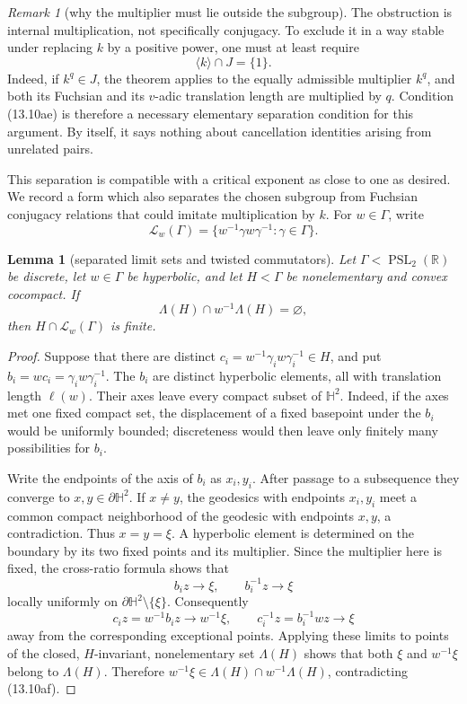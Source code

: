 \documentclass[11pt,reqno]{amsart}
\newtheorem{lemma}[theorem]{Lemma}
\theoremstyle{definition}
\theoremstyle{remark}
\newtheorem{remark}[theorem]{Remark}
\newcommand{\R}{\mathbb R}
\newcommand{\PSL}{\operatorname{PSL}}
\begin{document}
\begin{remark}[why the multiplier must lie outside the subgroup]
The obstruction is internal multiplication, not specifically conjugacy.
To exclude it in a way stable under replacing \(k\) by a positive power,
one must at least require
\[
 \langle k\rangle\cap J=\{1\}.
\tag{13.10ae}
\]
Indeed, if \(k^q\in J\), the theorem applies to the equally admissible
multiplier \(k^q\), and both its Fuchsian and its \(v\)-adic translation
length are multiplied by \(q\).  Condition (13.10ae) is therefore a
necessary elementary separation condition for this argument.  By itself,
it says nothing about cancellation identities arising from unrelated pairs.
\end{remark}

This separation is compatible with a critical exponent as close
to one as desired.  We record a form which also separates the chosen
subgroup from Fuchsian conjugacy relations that could imitate multiplication
by \(k\).  For \(w\in\Gamma\), write
\[
 \mathcal L_w(\Gamma)
 =\{w^{-1}\gamma w\gamma^{-1}:\gamma\in\Gamma\}.
\]

\begin{lemma}[separated limit sets and twisted commutators]
\label{lem:finite-twisted-commutators}
Let \(\Gamma<\PSL_2(\R)\) be discrete, let \(w\in\Gamma\) be hyperbolic,
and let \(H<\Gamma\) be nonelementary and convex cocompact.  If
\[
 \Lambda(H)\cap w^{-1}\Lambda(H)=\varnothing,
\tag{13.10af}
\]
then \(H\cap\mathcal L_w(\Gamma)\) is finite.
\end{lemma}

\begin{proof}
Suppose that there are distinct
\(c_i=w^{-1}\gamma_iw\gamma_i^{-1}\in H\), and put
\(b_i=wc_i=\gamma_iw\gamma_i^{-1}\).  The \(b_i\) are distinct
hyperbolic elements, all with translation length \(\ell(w)\).  Their axes
leave every compact subset of \(\mathbb H^2\).  Indeed, if the axes met one
fixed compact set, the displacement of a fixed basepoint under the \(b_i\)
would be uniformly bounded; discreteness would then leave only finitely
many possibilities for \(b_i\).

Write the endpoints of the axis of \(b_i\) as \(x_i,y_i\).  After passage
to a subsequence they converge to \(x,y\in\partial\mathbb H^2\).  If
\(x\ne y\), the geodesics with endpoints \(x_i,y_i\) meet a common compact
neighborhood of the geodesic with endpoints \(x,y\), a contradiction.
Thus \(x=y=\xi\).  A hyperbolic element is determined on the boundary by
its two fixed points and its multiplier.  Since the multiplier here is
fixed, the cross-ratio formula shows that
\[
 b_i z\longrightarrow\xi,
 \qquad b_i^{-1}z\longrightarrow\xi
\]
locally uniformly on
\(\partial\mathbb H^2\setminus\{\xi\}\).  Consequently
\[
 c_i z=w^{-1}b_i z\longrightarrow w^{-1}\xi,
 \qquad
 c_i^{-1}z=b_i^{-1}wz\longrightarrow\xi
\]
away from the corresponding exceptional points.  Applying these limits
to points of the closed, \(H\)-invariant, nonelementary set \(\Lambda(H)\)
shows that both \(\xi\) and \(w^{-1}\xi\) belong to \(\Lambda(H)\).
Therefore
\(w^{-1}\xi\in\Lambda(H)\cap w^{-1}\Lambda(H)\), contradicting
(13.10af).
\end{proof}
\end{document}
